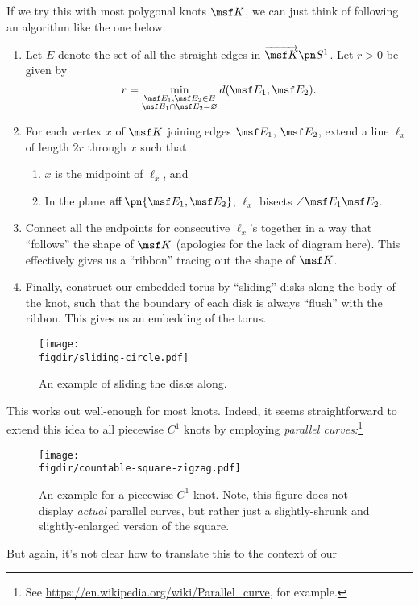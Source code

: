 If we try this with most polygonal knots $\msf K$, we can just think
of following an algorithm like the one below:
\begin{enumerate}[label=\arabic*)]\label{alg:tubular-neighborhood}
  \item Let $E$ denote the set of all the straight edges in $\fim{\msf
    K}{S^1}$. Let $r > 0$ be given by
    \[
    r = \min_{\substack{\msf E_1, \msf E_2 \in E \\ \msf E_1 \cap \msf
    E_2 = \varnothing}} d(\msf E_1, \msf E_2).
    \]
  \item For each vertex $x$ of $\msf K$ joining edges $\msf E_1$,
    $\msf E_2$, extend a line $\ell_x$ of length $2r$ through $x$ such
    that
    \begin{enumerate}
      \item $x$ is the midpoint of $\ell_x$, and
      \item In the plane $\aff\pn{\msf E_1, \msf E_2}$, $\ell_x$
        bisects $\angle \msf E_1\msf E_2$.
    \end{enumerate}
  \item Connect all the endpoints for consecutive $\ell_x$'s
    together in a way that ``follows'' the shape of $\msf K$
    (apologies for the lack of diagram here). This effectively gives
    us a ``ribbon'' tracing out the shape of $\msf K$.
  \item Finally, construct our embedded torus by ``sliding'' disks
    along the body of the knot, such that the boundary of each disk is
    always ``flush'' with the ribbon. This gives us an embedding of
    the torus.
\end{enumerate}
\begin{figure}[H]
  \centering
  \texttt{[image: \\figdir/sliding-circle.pdf]}
  \caption{An example of sliding the disks along.}
\end{figure}
This works out well-enough for most knots. Indeed, it seems
straightforward to extend this idea to all piecewise $C^1$ knots by
employing \emph{parallel curves:}\footnote{See
  \url{https://en.wikipedia.org/wiki/Parallel_curve}, for example.}
\begin{figure}[H]
  \centering
  \texttt{[image: \\figdir/countable-square-zigzag.pdf]}
  \caption{An example for a piecewise $C^1$ knot. Note, this figure
    does not display \emph{actual} parallel curves, but rather just a
    slightly-shrunk and slightly-enlarged version of the square.}
\end{figure}
But again, it's not clear how to translate this to the context of our
